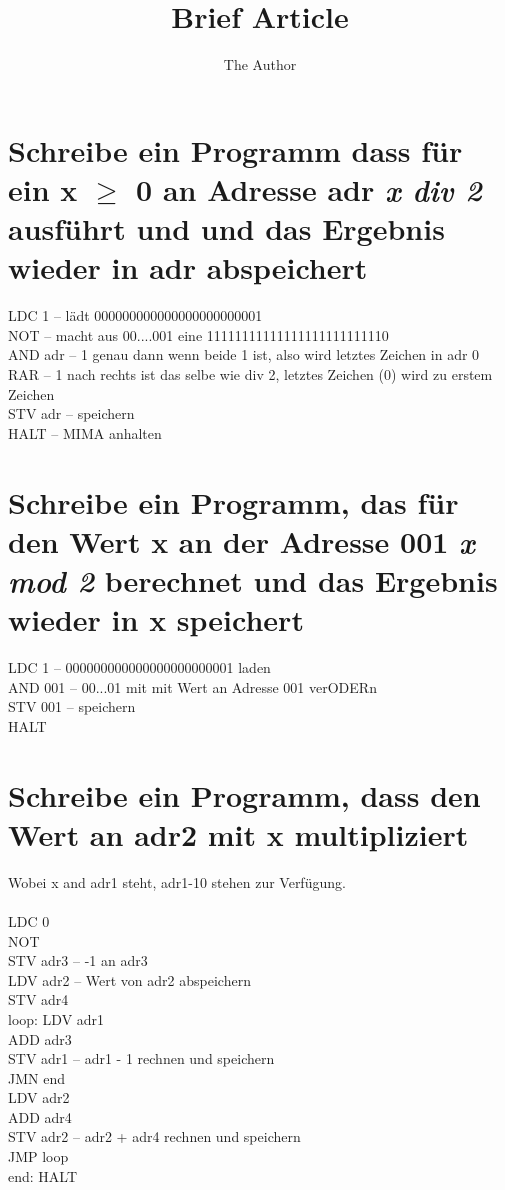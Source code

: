 \documentclass[11pt]{article} %
\title{Brief Article}
\author{The Author}
\begin{document}
\maketitle

\section{Schreibe ein Programm dass für ein x $\geq$ 0 an Adresse adr \emph{x div 2}
ausführt und und das Ergebnis wieder in adr abspeichert }

LDC 1 -- lädt 000000000000000000000001\\
NOT -- macht aus 00....001 eine 11111111111111111111111110\\
AND adr -- 1 genau dann wenn beide 1 ist, also wird letztes Zeichen in adr 0\\
RAR -- 1 nach rechts ist das selbe wie div 2, letztes Zeichen (0) wird zu erstem Zeichen\\
STV adr -- speichern\\
HALT -- MIMA anhalten\\

\section{Schreibe ein Programm, das für den Wert x an der Adresse 001 \emph{x mod
2} berechnet und das Ergebnis wieder in x speichert}

LDC 1 -- 000000000000000000000001 laden\\
AND 001 -- 00...01 mit mit Wert an Adresse 001 verODERn\\
STV 001 -- speichern\\
HALT\\

\section{Schreibe ein Programm, dass den Wert an adr2 mit x multipliziert}
Wobei x and adr1 steht, adr1-10 stehen zur Verfügung.\\
\ \\
 LDC 0 \\
NOT \\
STV adr3 -- -1 an adr3 \\
LDV adr2 -- Wert von adr2 abspeichern \\
STV adr4 \\
loop: LDV adr1 \\
ADD adr3 \\
STV adr1 -- adr1 - 1 rechnen und speichern \\
JMN end \\
LDV adr2 \\
ADD adr4 \\
STV adr2 -- adr2 + adr4 rechnen und speichern \\
JMP loop \\
end: HALT
\end{document}
